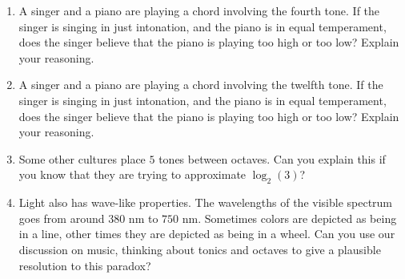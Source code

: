 \begin{enumerate}
\item A singer and a piano are playing a chord involving the fourth
  tone. If the singer is singing in just intonation, and the piano is
  in equal temperament, does the singer believe that the piano is
  playing too high or too low? Explain your reasoning.
\item A singer and a piano are playing a chord involving the twelfth
  tone. If the singer is singing in just intonation, and the piano is
  in equal temperament, does the singer believe that the piano is
  playing too high or too low? Explain your reasoning.
\item Some other cultures place $5$ tones between octaves. Can you
  explain this if you know that they are trying to approximate
  $\log_2(3)$?
\item Light also has wave-like properties. The wavelengths of the
  visible spectrum goes from around $380$ nm to $750$ nm. Sometimes
  colors are depicted as being in a line, other times they are
  depicted as being in a wheel. Can you use our discussion on music,
  thinking about tonics and octaves to give a plausible resolution to
  this paradox?



\end{enumerate}

